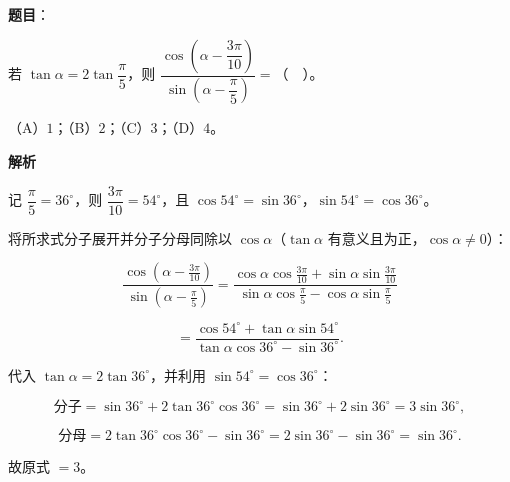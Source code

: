 \begin{answer}

\textbf{题目}：

若 $\tan\alpha=2\tan\dfrac{\pi}{5}$，则 $\dfrac{\cos\left(\alpha-\dfrac{3\pi}{10}\right)}{\sin\left(\alpha-\dfrac{\pi}{5}\right)}=$（　）。

（A）$1$；（B）$2$；（C）$3$；（D）$4$。

\textbf{解析}

记 $\dfrac{\pi}{5}=36^\circ$，则 $\dfrac{3\pi}{10}=54^\circ$，且 $\cos 54^\circ=\sin 36^\circ$，$\sin 54^\circ=\cos 36^\circ$。

将所求式分子展开并分子分母同除以 $\cos\alpha$（$\tan\alpha$ 有意义且为正，$\cos\alpha\ne 0$）：

\nopagebreak[4]
\[
\frac{\cos\left(\alpha-\frac{3\pi}{10}\right)}{\sin\left(\alpha-\frac{\pi}{5}\right)}
=\frac{\cos\alpha\cos\frac{3\pi}{10}+\sin\alpha\sin\frac{3\pi}{10}}
{\sin\alpha\cos\frac{\pi}{5}-\cos\alpha\sin\frac{\pi}{5}}
\]

\nopagebreak[4]
\[
=\frac{\cos 54^\circ+\tan\alpha\sin 54^\circ}{\tan\alpha\cos 36^\circ-\sin 36^\circ}.
\]

代入 $\tan\alpha=2\tan 36^\circ$，并利用 $\sin 54^\circ=\cos 36^\circ$：

\nopagebreak[4]
\[
\text{分子}=\sin 36^\circ+2\tan 36^\circ\cos 36^\circ
=\sin 36^\circ+2\sin 36^\circ=3\sin 36^\circ,
\]

\nopagebreak[4]
\[
\text{分母}=2\tan 36^\circ\cos 36^\circ-\sin 36^\circ
=2\sin 36^\circ-\sin 36^\circ=\sin 36^\circ.
\]

故原式 $=3$。


\end{answer}
